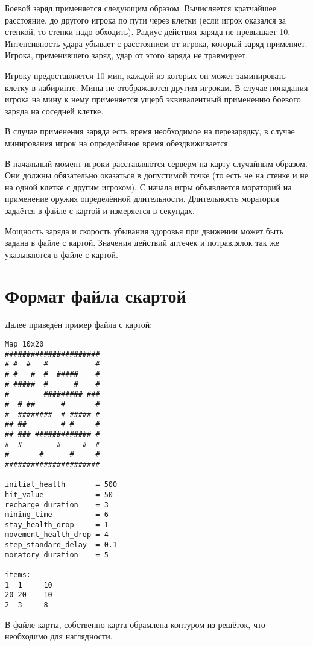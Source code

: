 \documentclass[russian,a4paper]{article}
\begin{document}
Боевой заряд применяется следующим образом. Вычисляется кратчайшее 
расстояние, до другого игрока по пути через клетки (если игрок оказался за
стенкой, то стенки надо обходить). Радиус действия заряда не
превышает 10. Интенсивность удара убывает с расстоянием от игрока,
который заряд применяет. Игрока, применившего заряд, удар от этого
заряда не травмирует. 

Игроку предоставляется 10 мин, каждой из которых он может заминировать
клетку в лабиринте. Мины не отображаются другим игрокам. В случае попадания 
игрока на мину к нему применяется ущерб эквивалентный применению боевого 
заряда на соседней клетке.

В случае применения заряда есть время необходимое на перезарядку,
в случае минирования игрок на определённое время обездвиживается.

В начальный момент игроки расставляются серверм на карту случайным образом. Они
должны обязательно оказаться в допустимой точке (то есть не на стенке и 
не на одной клетке с другим игроком). С начала игры объявляется 
мораторий на применение оружия определённой длительности. Длительность моратория 
задаётся в файле с картой и измеряется в секундах.

Мощность заряда и скорость убывания здоровья при движении
может быть задана в файле с картой.
Значения действий аптечек и потравлялок так же указываются в файле с картой.

\newpage
\section{Формат файла скартой}

Далее приведён пример файла с картой:
\begin{verbatim}
Map 10x20
######################
# #  #   #           #
# #   #  #  #####    #
# #####  #      #    #
#        ######### ###
#  # ##      #       #
#  ########  # ##### #
## ##        # #     #
## ### ############# #
#  #        #     #  #
#       #      #     #
######################

initial_health       = 500
hit_value            = 50
recharge_duration    = 3
mining_time          = 6
stay_health_drop     = 1
movement_health_drop = 4
step_standard_delay  = 0.1
moratory_duration    = 5

items:
1  1     10
20 20   -10
2  3     8
\end{verbatim}

В файле карты, собственно карта обрамлена
контуром из решёток, что необходимо для
наглядности.
\end{document}
